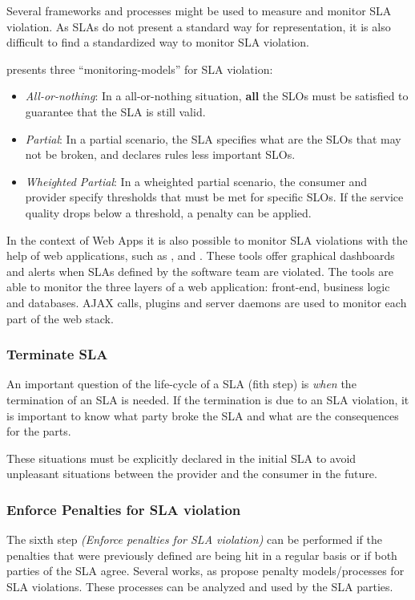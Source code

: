 Several frameworks and processes might be used to measure and monitor SLA violation. As SLAs do not present a standard way for representation, it is also difficult to find a standardized way to monitor SLA violation. 

\cite{ranna2008} presents three ``monitoring-models'' for SLA violation: 

\begin{itemize}
   \item{\textit{All-or-nothing}: In a all-or-nothing situation, \textbf{all} the SLOs must be satisfied to guarantee that the SLA is still valid.}
   \item{\textit{Partial}: In a partial scenario, the SLA specifies what are the SLOs that may not be broken, and declares rules less important SLOs.}
   \item{\textit{Wheighted Partial}: In a wheighted partial scenario, the consumer and provider specify thresholds that must be met for specific SLOs. If the service quality drops below a threshold, a penalty can be applied. 
}

\end{itemize}

In the context of Web Apps it is also possible to monitor SLA violations with the help of web applications, such as \cite{datadog}, \cite{appsee} and \cite{newrelic}. These tools offer graphical dashboards and alerts when SLAs defined by the software team are violated. The tools are able to monitor the three layers of a web application: front-end, business logic and databases. AJAX calls, plugins and server daemons are used to monitor each part of the web stack. 

\subsubsection{Terminate SLA}
An important question of the life-cycle of a SLA (fith step) is \textit{when} the termination of an SLA is needed. If the termination is due to an SLA violation, it is important to know what party broke the SLA and what are the consequences for the parts.

These situations must be explicitly declared in the initial SLA to avoid unpleasant situations between the provider and the consumer in the future.

\subsubsection{Enforce Penalties for SLA violation}
The sixth step \textit{(Enforce penalties for SLA violation)} can be performed if the penalties that were previously defined are being hit in a regular basis or if both parties of the SLA agree. Several works, as \cite{Lee:2010:PSR:1844765.1845204} propose penalty models/processes for SLA violations. These processes can be analyzed and used by the SLA parties. 

